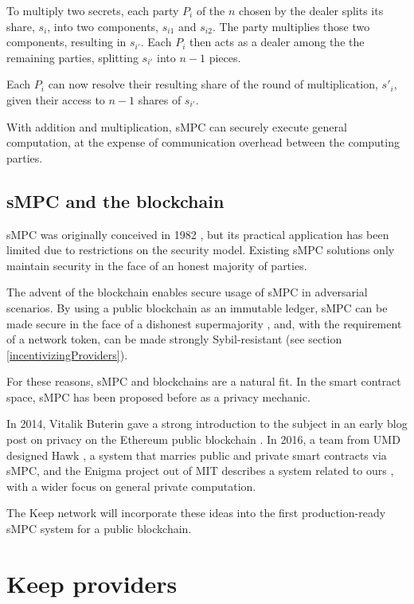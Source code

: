 \documentclass[11pt]{article}
\begin{document}
To multiply two secrets, each party $P_i$ of the $n$ chosen by the
dealer splits its share, $s_i$, into two components, $s_{i1}$ and
$s_{i2}$. The party multiplies those two components, resulting in
$s_{i'}$. Each $P_i$ then acts as a dealer among the the remaining
parties, splitting $s_{i'}$ into $n-1$ pieces.

Each $P_i$ can now resolve their resulting share of the round of
multiplication, $s'_i$, given their access to $n-1$ shares of
$s_{i'}$.

With addition and multiplication, sMPC can securely execute general
computation, at the expense of communication overhead between the
computing parties.

\subsection{sMPC and the blockchain}

sMPC was originally conceived in 1982 \cite{yao1982protocols}, but its
practical application has been limited due to restrictions on the
security model. Existing sMPC solutions only maintain security in the
face of an honest majority of parties.

The advent of the blockchain enables secure usage of sMPC in
adversarial scenarios. By using a public blockchain as an immutable
ledger, sMPC can be made secure in the face of a dishonest
supermajority \cite{spdz}, and, with the requirement of a network
token, can be made strongly Sybil-resistant
(see section \ref{incentivizingProviders}).

For these reasons, sMPC and blockchains are a natural fit. In the
smart contract space, sMPC has been proposed before as a privacy
mechanic.

In 2014, Vitalik Buterin gave a strong introduction to the subject in
an early blog post on privacy on the Ethereum public blockchain
\cite{secretSharingDaos}. In 2016, a team from UMD designed Hawk
\cite{hawk}, a system that marries public and private smart contracts
via sMPC, and the Enigma project out of MIT describes a system related
to ours \cite{enigma}, with a wider focus on general private
computation.

The Keep network will incorporate these ideas into the first
production-ready sMPC system for a public blockchain.

\section{Keep providers} \label{keepProviders}
\end{document}
